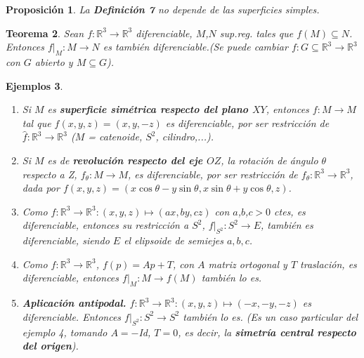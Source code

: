 \documentclass[ebook,oneside]{memoir}
\newtheorem{thm}{Teorema}[chapter]
\newtheorem{prop}[thm]{Proposición}
\newtheorem{eje}[thm]{Ejemplos}
\begin{document}
\begin{prop}
La \textup{\textbf{Definici\'on 7}} no depende de las superficies simples.
\end{prop}

\begin{thm}
Sean  $f: \mathbb{R}^3 \rightarrow \mathbb{R}^3$ diferenciable, $M$,$N$ sup.reg. tales que $f(M) \subseteq N$. Entonces $f\vert_M : M \rightarrow N$ es tambi\'en diferenciable.(Se puede cambiar $f: G \subseteq \mathbb{R}^3 \rightarrow \mathbb{R}^3$ con $G$ abierto y $M\subseteq G$).
\end{thm}

\begin{eje}

\

\begin{enumerate}
\item
Si $M$ es \textbf{superficie sim\'etrica respecto del plano $XY$}, entonces $f: M \rightarrow M$ tal que $f(x,y,z)=(x,y,-z)$ es diferenciable, por ser restricci\'on de $\widehat{f} : \mathbb{R}^3 \rightarrow \mathbb{R}^3$ ($M$ = catenoide, $S^2$, cilindro,...).

\item Si $M$ es de \textbf{revoluci\'on respecto del eje $OZ$}, la rotaci\'on de \'angulo $\theta$ respecto a Z, $f_{\theta}: M\rightarrow M$, es diferenciable, por ser restricci\'on de $f_{\theta}: \mathbb{R}^3 \rightarrow \mathbb{R}^3$, dada por $f(x,y,z)=(x\cos\theta - y\sin\theta, x\sin\theta+ y\cos\theta,z)$.

\item
Como $f: \mathbb{R}^3 \rightarrow \mathbb{R}^3:(x,y,z)\longmapsto(ax,by,cz)$ con $a$,$b$,$c >0$ ctes, es diferenciable, entonces su restricci\'on a $S^2$, $f\vert_{S^2}: S^2 \rightarrow E$, tambi\'en es diferenciable, siendo $E$ el elipsoide de semiejes $a,b,c$.

\item
Como $f: \mathbb{R}^3 \rightarrow \mathbb{R}^3$, $f(p)= Ap + T$, con $A$ matriz ortogonal y $T$ traslaci\'on, es diferenciable, entonces $f\vert_{M}: M \rightarrow f(M)$ tambi\'en lo es.

\item \textbf{Aplicaci\'on antipodal.}
$f: \mathbb{R}^3 \rightarrow \mathbb{R}^3:(x,y,z) \longmapsto (-x,-y,-z)$ es diferenciable. Entonces $f\vert_{S^2}: S^2 \rightarrow S^2$ tambi\'en lo es. (Es un caso particular del ejemplo 4, tomando $A= -$Id, $T=0$, es decir, la \textbf{simetr\'ia central respecto del origen}).
\end{enumerate}
\end{eje}
\end{document}
